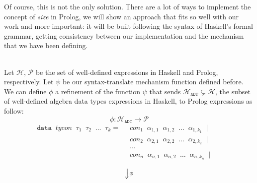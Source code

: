 \documentclass{report}
\theoremstyle{definition}
\theoremstyle{definition}
\newcommand{\ttt}[1]{\texttt{#1}}
\newcommand{\tav}{\;\;}
\newcommand{\SLongdownarrow}{\mathrel{\rotatebox[origin=c]{-90}{$\Longrightarrow$}}}
\begin{document}
Of course, this is not the only solution. There are a lot of ways to implement the concept of \textit{size} in Prolog, we will show an approach that fits so well with our work and more important: it will be built following the syntax of Haskell's formal grammar, getting consistency between our implementation and the mechanism that we have been defining.\\\\
\pagebreak

Let $\mathcal{H}$, $\mathcal{P}$ be the set of well-defined expressions in Haskell and Prolog, respectively. Let $\psi$ be our syntax-translate mechanism function defined before. We can define $\phi$ a refinement of the function $\psi$ that sends $\mathcal{H}_{\ttt{ADT}} \subsetneq \mathcal{H}$, the subset of well-defined algebra data types expressions in Haskell, to Prolog expressions as follow: $$\phi: \mathcal{H}_{\ttt{ADT}} \longrightarrow \mathcal{P} $$
\begin{align*}
	\ttt{data} \tav tycon \tav \tau_1 \tav \tau_2 \tav \ldots \tav \tau_k 	= & \tav con_1 \tav \alpha_{1,1} \tav \alpha_{1,2} \tav \ldots \tav \alpha_{1,k_1} \tav | &   &   \\
	                                                                         & \tav con_2 \tav \alpha_{2,1} \tav \alpha_{2,2} \tav \ldots \tav \alpha_{2,k_2} \tav | &   &   \\
	                                                                         & \tav \ldots \tav                                                                      &   &   \\
	                                                                         & \tav con_n \tav \alpha_{n,1} \tav \alpha_{n,2} \tav \ldots \tav \alpha_{n,k_n} \tav | &   &   \\
\end{align*}
$$\SLongdownarrow \phi$$
\end{document}

